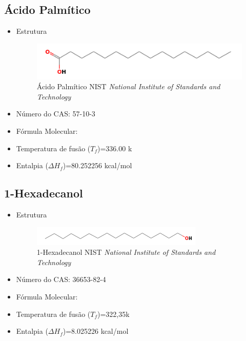 	\subsection{Ácido Palmítico}
	\label{sec:3}
	\begin{itemize}
		\item Estrutura
		\begin{figure}[H]
			\centering
			\includegraphics[width=0.65\linewidth]{dados/figuras/Ac_palmitico.png}
			\caption[Ácido Palmítico]{Ácido Palmítico NIST \textit{National Institute of Standards and Technology}}
			\label{fig:nist3}
		\end{figure}
		\item Número do CAS: 57-10-3
		\item Fórmula Molecular: 
		\item Temperatura de fusão ($T_f$)=336.00 k
		\item Entalpia ($\Delta H_{f}$)=80.252256 kcal/mol
	\end{itemize}
	
	\subsection{1-Hexadecanol}
	\label{sec:4}
	\begin{itemize}
		\item Estrutura
		\begin{figure}[H]
			\centering
			\includegraphics[width=0.8\linewidth]{dados/figuras/Hexadecanol.png}
			\caption[1-Hexadecanol]{1-Hexadecanol NIST \textit{National Institute of Standards and Technology}}
			\label{fig:8}
		\end{figure}
		\item Número do CAS: 36653-82-4
		\item Fórmula Molecular:
		\item Temperatura de fusão ($T_f$)=322,35k
		\item Entalpia ($\Delta H_{f}$)=8.025226 kcal/mol
	\end{itemize}
	


	